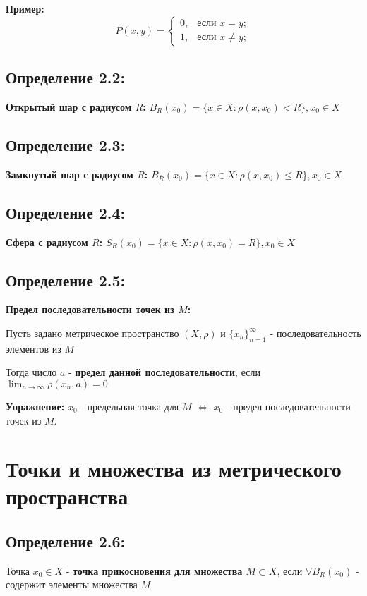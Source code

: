\documentclass[12pt]{article}
\begin{document}
\textbf{Пример:}
	$$
P(x,y) = \begin{cases}
   0, &\text{если } x = y; \\
   1, &\text{если } x \neq y;
\end{cases}
$$	
	
\subsection*{Определение 2.2:}
	\textbf{Открытый шар с радиусом $R$:}
	$B_R(x_0) = \{{x \in X : \rho(x,x_0) < R}\} , x_0 \in X$
	
\subsection*{Определение 2.3:}
	\textbf{Замкнутый шар с радиусом $R$:}
	$B_{\bar{R}}(x_0) = \{{x \in X : \rho(x,x_0) \leq R}\} , x_0 \in X$

\subsection*{Определение 2.4:}
	\textbf{Сфера с радиусом $R$:}
	$S_R(x_0) = \{{x \in X : \rho(x,x_0) = R}\} , x_0 \in X$

\subsection*{Определение 2.5:}
	\textbf{Предел последовательности точек из $M$:}
	
	Пусть задано метрическое пространство $(X,\rho)$ и $\{{x_n}\}_{n = 1}^{\infty}$ - последовательность элементов из $M$
	
	Тогда число $a$ - \textbf{предел данной последовательности}, если $\lim_{n \to \infty} \rho(x_n , a) = 0$
	
	
\textbf{Упражнение:}
	$x_0$ - предельная точка для $M$ $\Leftrightarrow$ $x_0$ - предел последовательности точек из $M$.

\newpage
\section{Точки и множества из метрического пространства}	

\subsection*{Определение 2.6:}
	 Точка $x_0 \in X$ - \textbf{точка прикосновения для множества $M \subset X$}, если $\forall B_R (x_0)$ - содержит элементы множества $M$
	    
\end{document}
